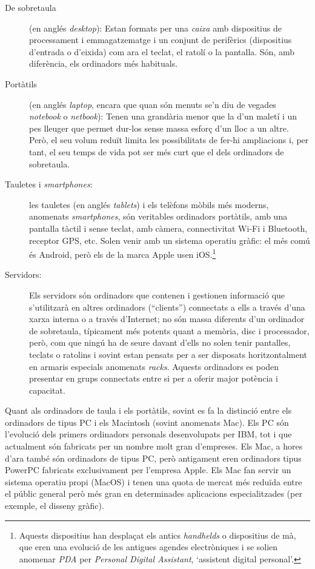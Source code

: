 \begin{description}
\item[De sobretaula] (en anglés \emph{desktop}): Estan formats per una
  \emph{caixa} amb dispositius de processament i emmagatzematge i un
  conjunt de perifèrics (dispositius d'entrada o d'eixida) com ara el
  teclat, el ratolí o la pantalla.  Són, amb diferència, els
  ordinadors més habituals.
\item[Portàtils] (en anglés \emph{laptop}, encara que quan són menuts
  se'n diu de vegades \emph{notebook} o \emph{netbook}): Tenen una
  grandària menor que la d'un maletí i un pes lleuger que permet
  dur-los sense massa esforç d'un lloc a un altre. Però, el seu volum
  reduït limita les possibilitats de fer-hi ampliacions i, per tant,
  el seu temps de vida pot ser més curt que el dels ordinadors de
  sobretaula. 
\item[Tauletes i \emph{smartphones}:] les tauletes (en anglés
  \emph{tablets}) i els telèfons mòbils més moderns, anomenats
  \emph{smartphones}, són veritables ordinadors por\-tà\-tils, amb una
  pantalla tàctil i sense teclat, amb càmera, connectivitat Wi-Fi i
  Bluetooth, receptor GPS, etc. Solen venir amb un sistema operatiu
  gràfic: el més comú és Android, però els de la marca Apple usen
  iOS.\footnote{Aquests dispositius han desplaçat els antics
    \emph{handhelds} o dispositius de mà, que eren una evolució de les
    antigues agendes electròniques i se solien anomenar \emph{PDA} per
    \emph{Personal Digital Assistant}, `assistent digital personal'.}

\item[Servidors:] Els servidors són ordinadors que contenen i
  gestionen informació que s'utilitzarà en altres ordinadors
  (``clients'') connectats a ells a través d'una xarxa interna o a
  través d'Internet; no són massa diferents d'un ordinador de
  sobretaula, típicament més potents quant a memòria, disc i
  processador, però, com que ningú ha de seure davant d'ells no solen
  tenir pantalles, teclats o ratolins i sovint estan pensats per a ser
  disposats horitzontalment en armaris especials anomenats
  \emph{racks}.  Aquests ordinadors es poden presentar en grups
  connectats entre si per a oferir major potència i capacitat.
\end{description}

Quant als ordinadors de taula i els portàtils, sovint es fa la
distinció entre els ordinadors de tipus PC i els Macintosh (sovint
anomenats Mac). Els PC són l'evolució dels primers ordinadors
personals desenvolupats per IBM, tot i que actualment són fabricats
per un nombre molt gran d'empreses. Els Mac, a hores d'ara també són
ordinadors de tipus PC, però antigament eren ordinadors tipus PowerPC
fabricats exclusivament per l'empresa Apple. Els Mac fan servir un
sistema operatiu propi (MacOS) i tenen una quota de mercat més reduïda
entre el públic general però més gran en determinades aplicacions
especialitzades (per exemple, el disseny gràfic).

